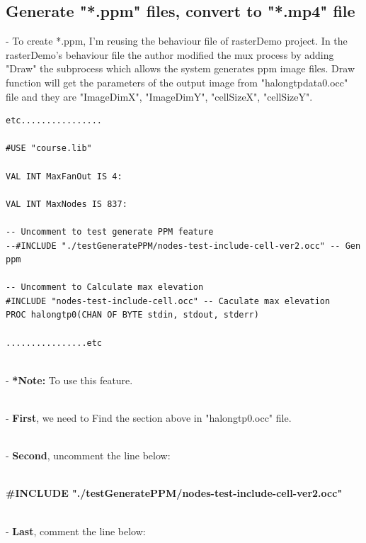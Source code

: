 \documentclass{article}
\begin{document}
\newpage
\raggedright
\subsection{Generate "*.ppm" files, convert to "*.mp4" file}
- To create *.ppm, I'm reusing the behaviour file of rasterDemo project. In the rasterDemo's behaviour file the author modified the mux process by adding "Draw" the subprocess which allows the system generates ppm image files. Draw function will get the parameters of the output image from "halongtpdata0.occ" file and they are "ImageDimX", "ImageDimY", "cellSizeX", "cellSizeY".
\\[1\baselineskip]
\begin{tcolorbox}
\begin{lstlisting}
etc................

#USE "course.lib"

VAL INT MaxFanOut IS 4:

VAL INT MaxNodes IS 837:

-- Uncomment to test generate PPM feature
--#INCLUDE "./testGeneratePPM/nodes-test-include-cell-ver2.occ" -- Gen ppm

-- Uncomment to Calculate max elevation
#INCLUDE "nodes-test-include-cell.occ" -- Caculate max elevation
PROC halongtp0(CHAN OF BYTE stdin, stdout, stderr)

................etc
\end{lstlisting}
\end{tcolorbox}
\\[1\baselineskip]

- \textbf{*Note:} To use this feature. 

\\[1\baselineskip]

- \textbf{First}, we need to Find the section above in "halongtp0.occ" file. 

\\[1\baselineskip]

- \textbf{Second}, uncomment the line below:

\\[1\baselineskip]

\textbf{#INCLUDE "./testGeneratePPM/nodes-test-include-cell-ver2.occ"}
 
\\[1\baselineskip]

- \textbf{Last}, comment the line below: 

\\[1\baselineskip]
\end{document}
